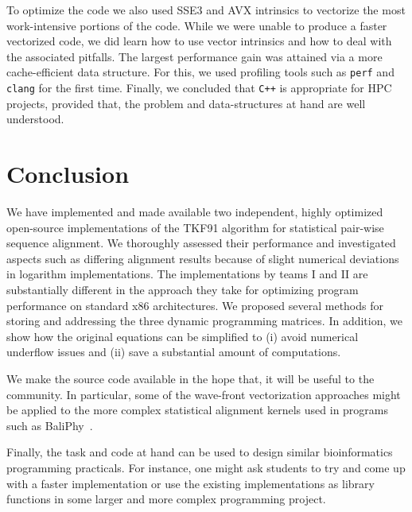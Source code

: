 \documentclass[runningheads,a4paper]{llncs}
\begin{document}
To optimize the code we also used SSE3 and AVX intrinsics to vectorize the most work-intensive portions of the code.
While we were unable to produce a faster vectorized code, we did learn how to use vector intrinsics and how to deal with the associated pitfalls.
The largest performance gain was attained via a more cache-efficient data structure.
For this, we used profiling tools such as \texttt{perf} and \texttt{clang} for the first time.
Finally,  we concluded that \texttt{C++} is appropriate for HPC projects, provided that, the problem and data-structures at hand are well understood.


\section{Conclusion}
\label{conclusion}
We have implemented and made available two independent, highly optimized open-source implementations of the TKF91 algorithm for statistical pair-wise sequence alignment.
We thoroughly assessed their performance and investigated aspects such as differing alignment results because of slight numerical deviations in logarithm implementations.
The implementations by teams I and II are substantially different in the approach they take for optimizing program performance on standard x86 architectures.
We proposed several methods for storing and addressing the three dynamic programming matrices. In addition, we show how the original equations can be simplified
to (i) avoid numerical underflow issues and (ii) save a substantial amount of computations.

We make the source code available in the hope that, it will be useful to the community.
In particular, some of the wave-front vectorization approaches might be applied to the more complex statistical alignment kernels used in programs
such as BaliPhy~\cite{suchard2006bali}.

Finally, the task and code at hand can be used to design similar bioinformatics programming practicals. For instance, one might ask students to try and
come up with a faster implementation or use the existing implementations as library functions in some larger and more complex programming project.





\end{document}
